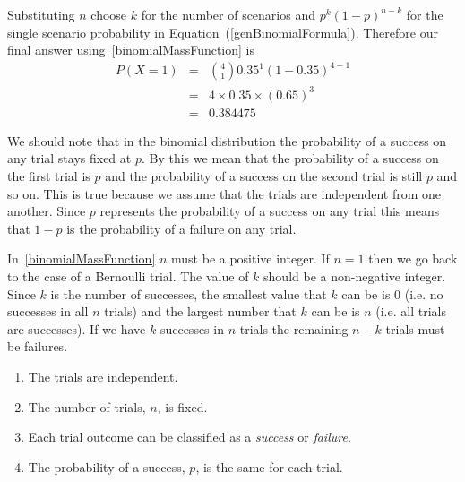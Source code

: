 Substituting $n$ choose $k$ for the number of scenarios and $p^k(1-p)^{n-k}$ for the single scenario probability in Equation~(\ref{genBinomialFormula}). %
Therefore our final answer using~\ref{binomialMassFunction} is
\begin{eqnarray*}
P(X = 1)	&=& \displaystyle{ 4 \choose 1} 0.35^1 (1-0.35)^{4-1}	\\[1mm]
		&=& 4 \times 0.35 \times (0.65)^{3}					\\[1.5mm]
		&=&	0.384475
\end{eqnarray*}


We should note that in the binomial distribution the probability of a success on any trial stays fixed at $p$.
By this we mean that the probability of a success on the first trial is $p$ and 
the probability of a success on the second trial is still $p$ and so on.
This is true because we assume that the trials are independent from one another.
Since $p$ represents the probability of a success on any trial this means that $1-p$ is the
probability of a failure on any trial.

In~\ref{binomialMassFunction} $n$ must be a positive integer.
If $n=1$ then we go back to the case of a Bernoulli trial.
The value of $k$ should be a non-negative integer.
Since $k$ is the number of successes, the smallest value that $k$ can be is 0 (i.e. no successes in all $n$ trials)
and the largest number that $k$ can be is $n$ (i.e. all trials are successes).
If we have $k$ successes in $n$ trials the remaining $n-k$ trials must be failures.



\begin{tipBox}{
\vspace{-0.50cm}
\begin{enumerate}
\item	The trials are independent. 
\item	The number of trials, $n$, is fixed. 
\item	Each trial outcome can be classified as a \emph{success} or \emph{failure}.
\item	The probability of a success, $p$, is the same for each trial.
\end{enumerate}
}
\end{tipBox}



